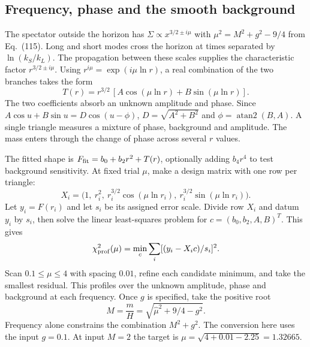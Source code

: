\documentclass[11pt,a4paper]{article}
\begin{document}
\subsection{Frequency, phase and the smooth background}
The spectator outside the horizon has $\Sigma\propto x^{3/2\pm i\mu}$ with $\mu^2=M^2+g^2-9/4$ from Eq.~(115). Long and short modes cross the horizon at times separated by $\ln(k_S/k_L)$. The propagation between these scales supplies the characteristic factor $r^{3/2\pm i\mu}$. Using $r^{i\mu}=\exp(i\mu\ln r)$, a real combination of the two branches takes the form
\[
 T(r)=r^{3/2}\,[A\cos(\mu\ln r)+B\sin(\mu\ln r)].
\]
The two coefficients absorb an unknown amplitude and phase. Since $A\cos u+B\sin u=D\cos(u-\phi)$, $D=\sqrt{A^2+B^2}$ and $\phi=\operatorname{atan2}(B,A)$. A single triangle measures a mixture of phase, background and amplitude. The mass enters through the change of phase across several $r$ values.

The fitted shape is $F_{\rm fit}=b_0+b_2r^2+T(r)$, optionally adding $b_4r^4$ to test background sensitivity. At fixed trial $\mu$, make a design matrix with one row per triangle:
\[
 X_i=\big(1,\ r_i^2,\ r_i^{3/2}\cos(\mu\ln r_i),\ r_i^{3/2}\sin(\mu\ln r_i)\big).
\]
Let $y_i=F(r_i)$ and let $s_i$ be its assigned error scale. Divide row $X_i$ and datum $y_i$ by $s_i$, then solve the linear least-squares problem for $c=(b_0,b_2,A,B)^T$. This gives
\[
 \chi^2_{\rm prof}(\mu)=\min_c\sum_i[(y_i-X_i c)/s_i]^2.
\]
Scan $0.1\le\mu\le4$ with spacing $0.01$, refine each candidate minimum, and take the smallest residual. This profiles over the unknown amplitude, phase and background at each frequency. Once $g$ is specified, take the positive root
\begin{equation}
 M=\frac mH=\sqrt{\hat\mu^2+9/4-g^2}.
\end{equation}
Frequency alone constrains the combination $M^2+g^2$. The conversion here uses the input $g=0.1$. At input $M=2$ the target is $\mu=\sqrt{4+0.01-2.25}=1.32665$.
\end{document}
